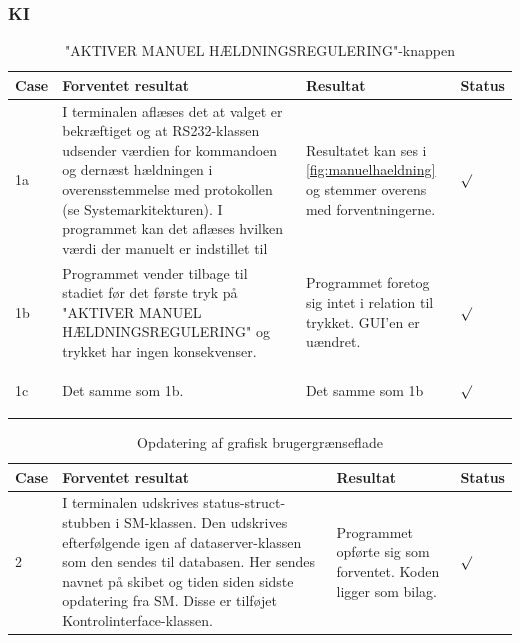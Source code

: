 \subsubsection{KI}
\begin{table}[H]
\caption{"AKTIVER MANUEL HÆLDNINGSREGULERING"-knappen}
\centering
\begin{tabular}{| p{1cm}  | p{6cm} | p{5cm} | p{1cm} |}
\hline
Case &Forventet resultat &Resultat &Status\\\hline

1a &I terminalen aflæses det at valget er bekræftiget og at RS232-klassen udsender værdien for kommandoen og dernæst hældningen i overensstemmelse med protokollen (se Systemarkitekturen). I programmet kan det aflæses hvilken værdi der manuelt er indstillet til &Resultatet kan ses i \ref{fig:manuelhaeldning} og stemmer overens med forventningerne. &\begin{Huge}$\surd$\end{Huge} \\\hline 

1b &Programmet vender tilbage til stadiet før det første tryk på "AKTIVER MANUEL HÆLDNINGSREGULERING" og trykket har ingen konsekvenser. &Programmet foretog sig intet i relation til trykket. GUI'en er uændret. &\begin{Huge}$\surd$\end{Huge} \\\hline 

1c &Det samme som 1b.&Det samme som 1b&\begin{Huge}$\surd$\end{Huge}\\\hline
\end{tabular}
\end{table}

\begin{table}[H]
\caption{Opdatering af grafisk brugergrænseflade}
\centering
\begin{tabular}{| p{1cm}  | p{6cm} | p{5cm} | p{1cm} |}
\hline
Case &Forventet resultat &Resultat &Status\\\hline
2 &I terminalen udskrives status-struct-stubben i SM-klassen. Den udskrives efterfølgende igen af dataserver-klassen som den sendes til databasen. Her sendes navnet på skibet og tiden siden sidste opdatering fra SM. Disse er tilføjet Kontrolinterface-klassen.&Programmet opførte sig som forventet. Koden ligger som bilag.&\begin{Huge}$\surd$\end{Huge}\\\hline
\end{tabular}
\end{table}

